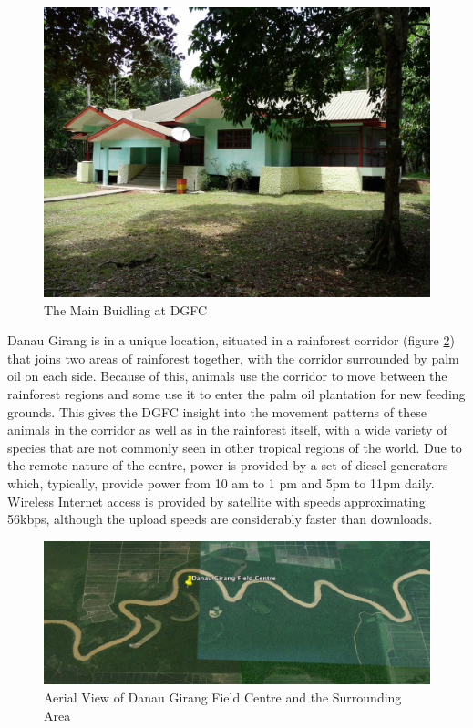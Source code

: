 		\begin{figure}[h]
		\centering
		\includegraphics[width=\textwidth]{Chap3/figures/field_centre}
		\caption{The Main Buidling at DGFC}
		\label{tech:fig:map}
		\end{figure}

Danau Girang is in a unique location, situated in a rainforest corridor (figure \ref{tech:fig:map}) that joins two areas of rainforest together, with the corridor surrounded by palm oil on each side. Because of this, animals use the corridor to move between the rainforest regions and some use it to enter the palm oil plantation for new feeding grounds. This gives the DGFC insight into the movement patterns of these animals in the corridor as well as in the rainforest itself, with a wide variety of species that are not commonly seen in other tropical regions of the world. Due to the remote nature of the centre, power is provided by a set of diesel generators which, typically, provide power from 10 am to 1 pm and 5pm to 11pm daily. Wireless Internet access is provided by satellite with speeds approximating 56kbps, although the upload speeds are considerably faster than downloads.

		\begin{figure}[h]
		\centering
		\includegraphics[width=\textwidth]{Chap3/figures/dg_map}
		\caption{Aerial View of Danau Girang Field Centre and the Surrounding Area}
		\label{tech:fig:map}
		\end{figure}

